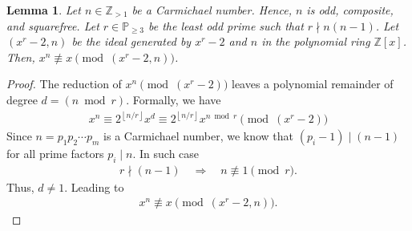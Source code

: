 \documentclass{article}
\theoremstyle{plain}
\newtheorem{lemma}[theorem]{Lemma}
\theoremstyle{definition}
\newcommand{\floor}[1]{\left\lfloor #1 \right\rfloor}
\newcommand{\Z}{\mathbb{Z}}
\begin{document}
\begin{lemma} \label{proof:carmichalenumberxnnotequalsx}
Let $n \in \Z_{>1}$ be a Carmichael number. Hence, $n$ is odd, composite, and squarefree. Let $r \in \mathbb{P}_{\geq 3}$ be the least odd prime such that $r \nmid n (n-1)$. Let $(x^r-2, n)$ be the ideal generated by $x^r-2$ and $n$ in the polynomial ring $\Z[x]$. Then, $x^n \not\equiv x \pmod{(x^r-2,n)}$.
\end{lemma}
\begin{proof}
The reduction of $x^n \pmod{(x^r-2)}$ leaves a polynomial remainder of degree $d = (n \bmod r)$. Formally, we have
\begin{align*}
    x^n \equiv 2^{\floor{n/r}} x^d \equiv 2^{\floor{n/r}} x^{n \bmod r} \pmod{(x^r-2)}
\end{align*}
Since $n = p_1 p_2 \cdots p_m$ is a Carmichael number, we know that $(p_i-1) \mid (n-1)$ for all prime factors $p_i \mid n$. In such case
\begin{align*}
    r \nmid (n-1) \quad \Longrightarrow \quad n \not\equiv 1 \pmod{r} . 
\end{align*}
Thus, $d \not= 1$. Leading to
\begin{align*}
    x^n \not\equiv x \pmod{(x^r-2, n)} .
\end{align*}
\end{proof}
\end{document}
